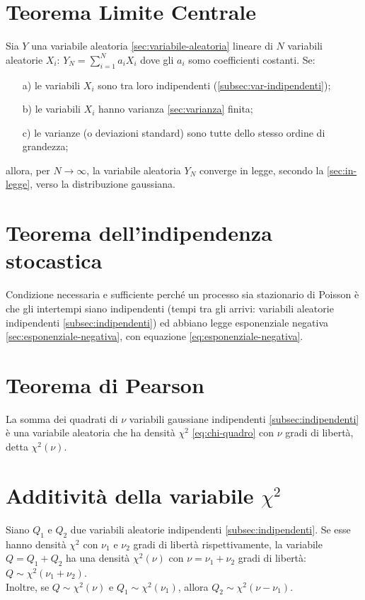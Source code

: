 \section{Teorema Limite Centrale} %
\label{sec:limite-centrale}
Sia $Y$ una variabile aleatoria \ref{sec:variabile-aleatoria} lineare di $N$ variabili aleatorie $X_i$: ${ Y }_{ N }=\sum _{ i=1 }^{ N }{ { a }_{ i }{ X }_{ i } } $ dove gli $a_i$ somo coefficienti costanti. Se:
\begin{itemize}
\item[a)] le variabili $X_i$ sono tra loro indipendenti (\ref{subsec:var-indipendenti});
\item[b)] le variabili $X_i$ hanno varianza \ref{sec:varianza} finita;
\item[c)] le varianze (o deviazioni standard) sono tutte dello stesso ordine di grandezza;
\end{itemize}
allora, per $N\rightarrow \infty $, la variabile aleatoria $Y_N$ converge in legge, secondo la \ref{sec:in-legge}, verso la distribuzione gaussiana.

\section{Teorema dell'indipendenza stocastica} %
\label{sec:indipendenza-stocastica}
Condizione necessaria e sufficiente perché un processo sia stazionario di Poisson è che gli intertempi siano indipendenti (tempi tra gli arrivi: variabili aleatorie indipendenti \ref{subsec:indipendenti}) ed abbiano legge esponenziale negativa \ref{sec:esponenziale-negativa}, con equazione \ref{eq:esponenziale-negativa}.

\section{Teorema di Pearson} %
\label{sec:pearson}
La somma dei quadrati di $\nu$ variabili gaussiane indipendenti \ref{subsec:indipendenti} è una variabile aleatoria che ha densità $\chi^2$ \ref{eq:chi-quadro} con $\nu$ gradi di libertà, detta $\chi^{2}(\nu)$.

\section{Additività della variabile $\chi^2$} %
\label{sec:add-chi}
Siano $Q_1$ e $Q_2$ due variabili aleatorie indipendenti \ref{subsec:indipendenti}. Se esse hanno densità $\chi^2$ con $\nu_1$ e $\nu_2$ gradi di libertà rispettivamente, la variabile $Q=Q_{1}+Q_{2}$ ha una densità $\chi^2(\nu)$ con $\nu=\nu_{1}+\nu_{2}$ gradi di libertà: $Q\sim { \chi  }^{ 2 }\left( \nu_1+\nu_2 \right) $. \\ Inoltre, se $Q\sim { \chi  }^{ 2 }\left( \nu  \right) $ e $Q_1\sim { \chi  }^{ 2 }\left( \nu_1  \right) $, allora $Q_2\sim { \chi  }^{ 2 }\left(\nu- \nu_1  \right) $.

